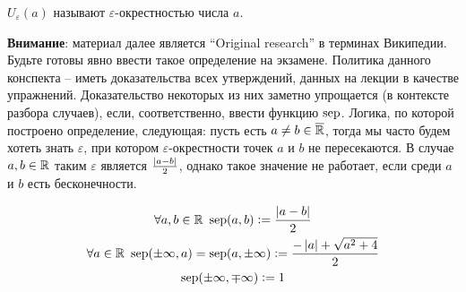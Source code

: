 $U_\varepsilon(a)$ называют $\varepsilon$-окрестностью числа $a$.

\textbf{Внимание}: материал далее является ``Original research'' в терминах Википедии. Будьте готовы явно ввести такое определение на экзамене. Политика данного конспекта -- иметь доказательства всех утверждений, данных на лекции в качестве упражнений. Доказательство некоторых из них заметно упрощается (в контексте разбора случаев), если, соответственно, ввести функцию $\operatorname{sep}$. Логика, по которой построено определение, следующая: пусть есть $a \ne b \in \overline{\mathbb{R}}$, тогда мы часто будем хотеть знать $\varepsilon$, при котором $\varepsilon$-окрестности точек $a$ и $b$ не пересекаются. В случае $a, b \in \mathbb{R}$ таким $\varepsilon$ является $\frac{\left\lvert a - b \right\rvert}{2}$, однако такое значение не работает, если среди $a$ и $b$ есть бесконечности.

\begin{equation}
    \begin{gathered}
        \forall a, b \in \mathbb{R}\ \operatorname{sep}(a, b) \vcentcolon= \frac{\left\lvert a - b \right\rvert}{2} \\
        \forall a \in \mathbb{R}\ \operatorname{sep}(\pm\infty, a) = \operatorname{sep}(a, \pm\infty) \vcentcolon= \frac{-\left\lvert a \right\rvert + \sqrt{a^2+4}}{2} \\
        \operatorname{sep}(\pm\infty, \mp\infty) \vcentcolon= 1
    \end{gathered}
\end{equation}

